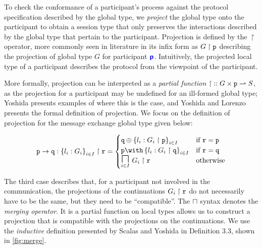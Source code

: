 To check the conformance of a participant's process 
against the protocol specification 
described by the global type, 
we \textit{project} the global type onto the participant
to obtain a session type that only preserves the 
interactions described by the global type that 
pertain to the participant. 
Projection is defined by the $\upharpoonright$ operator, 
more commonly seen in literature in its infix form 
as ${G} \upharpoonright {\mathtt{p}}$ describing the projection of global type 
$G$ for participant ${\color{blue}\bm{\mathsf{p}}}$. 
Intuitively, the projected local type of a participant 
describes the protocol from the viewpoint of the participant.

More formally, projection can be interpreted as a 
\textit{partial function} 
${\upharpoonright} :: G \times {\mathtt{p}} \rightharpoonup S$,
as the projection for a participant may be undefined for 
an ill-formed global type; 
Yoshida \cite{C406Lecture} presents examples of where this is the case, 
and Yoshida and Lorenzo \cite{MPST} 
presents the formal definition of projection.
We focus on the definition of projection for the 
message exchange global type given below:

\[
\proj{\gcomm{p}{q}{l_i: G_i}{i \in I}}{r} =
\begin{cases}
\tsel{q}{l_i: \proj{G_i}{p}}{i \in I} 
	& \text{if } \mrole{r} = \mrole{p} \\
\tbra{p}{l_i: \proj{G_i}{q}}{i \in I} 
	& \text{if } \mrole{r} = \mrole{q} \\
\underset{i \in I}{\MERGEOP}~\proj{G_i}{r}
	& \text{otherwise} \\
\end{cases}
\]

The third case describes that,
for a participant not involved in the communication,
the projections of the continuations ${G_i} \upharpoonright {\mathtt{r}}$
do not necessarily have to be the same, but they
need to be ``compatible''. 
The $\sqcap$ syntax denotes the \textit{merging operator}.
It is a partial function on local types allows us to construct
a projection that is compatible with the projections on
the continuations.
We use the \textit{inductive} definition presented by
Scalas and Yoshida in \cite{LessIsMore} Definition 3.3,
shown in \cref{fig:merge}.

